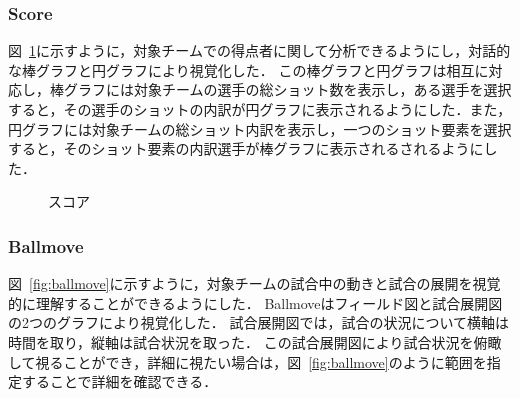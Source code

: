 \documentclass[sotsuron]{kuee}
\begin{document}
			\subsubsection{Score}
				図~\ref{fig:score}に示すように，対象チームでの得点者に関して分析できるようにし，対話的な棒グラフと円グラフにより視覚化した．
				この棒グラフと円グラフは相互に対応し，棒グラフには対象チームの選手の総ショット数を表示し，ある選手を選択すると，その選手のショットの内訳が円グラフに表示されるようにした．また，円グラフには対象チームの総ショット内訳を表示し，一つのショット要素を選択すると，そのショット要素の内訳選手が棒グラフに表示されるされるようにした．
					\begin{figure}
						\begin{center}
						\end{center}
						\caption{スコア}
				  		\label{fig:score}
					\end{figure}
			\subsubsection{Ballmove}
				図~\ref{fig:ballmove}に示すように，対象チームの試合中の動きと試合の展開を視覚的に理解することができるようにした．
				Ballmoveはフィールド図と試合展開図の2つのグラフにより視覚化した．
				試合展開図では，試合の状況について横軸は時間を取り，縦軸は試合状況を取った．
				この試合展開図により試合状況を俯瞰して視ることができ，詳細に視たい場合は，図~\ref{fig:ballmove}のように範囲を指定することで詳細を確認できる．
\end{document}
